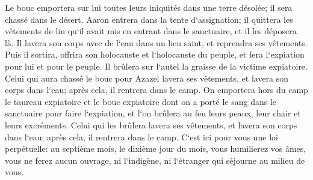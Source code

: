 \verse Le bouc emportera sur lui toutes leurs iniquités dans une terre désolée; il sera chassé dans le désert. 
\verse Aaron entrera dans la tente d`assignation; il quittera les vêtements de lin qu`il avait mis en entrant dans le sanctuaire, et il les déposera là. 
\verse Il lavera son corps avec de l`eau dans un lieu saint, et reprendra ses vêtements. Puis il sortira, offrira son holocauste et l`holocauste du peuple, et fera l`expiation pour lui et pour le peuple. 
\verse Il brûlera sur l`autel la graisse de la victime expiatoire. 
\verse Celui qui aura chassé le bouc pour Azazel lavera ses vêtements, et lavera son corps dans l`eau; après cela, il rentrera dans le camp. 
\verse On emportera hors du camp le taureau expiatoire et le bouc expiatoire dont on a porté le sang dans le sanctuaire pour faire l`expiation, et l`on brûlera au feu leurs peaux, leur chair et leurs excréments. 
\verse Celui qui les brûlera lavera ses vêtements, et lavera son corps dans l`eau; après cela, il rentrera dans le camp. 
\verse C`est ici pour vous une loi perpétuelle: au septième mois, le dixième jour du mois, vous humilierez vos âmes, vous ne ferez aucun ouvrage, ni l`indigène, ni l`étranger qui séjourne au milieu de vous. 
